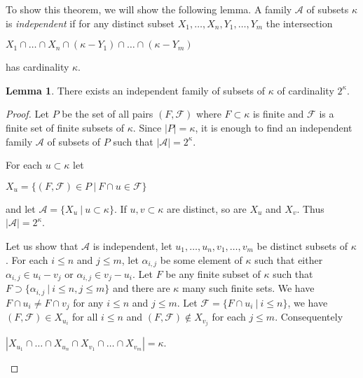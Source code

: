 \documentclass[8pt]{article}
\theoremstyle{definition}
\theoremstyle{definition}
\theoremstyle{definition}
\theoremstyle{definition}
\theoremstyle{definition}
\theoremstyle{definition}
\theoremstyle{definition}
\theoremstyle{definition}
\newtheorem{lemma}{Lemma}[section]
\theoremstyle{definition}
\theoremstyle{definition}
\theoremstyle{definition}
\theoremstyle{definition}
\theoremstyle{definition}
\theoremstyle{definition}
\theoremstyle{question}
\begin{document}
To show this theorem, we will show the following lemma. A family $\mathcal{A}$ 
of subsets $\kappa$ is \emph{independent} if for any distinct subset $X_1, \dots, X_n, Y_1, \dots, Y_m$ the intersection

\begin{center}
  $X_1 \cap \dots \cap X_n \cap (\kappa - Y_1) \cap \dots \cap (\kappa - Y_m)$
\end{center}
has cardinality $\kappa$.

\begin{lemma}
  There exists an independent family of subsets of $\kappa$ of cardinality $2^{\kappa}$.
\end{lemma}

\begin{proof}
  Let $P$ be the set of all pairs $(F, \mathcal{F})$ where $F \subset \kappa$ is finite and 
  $\mathcal{F}$ is a finite set of finite subsets of $\kappa$. Since $|P| = \kappa$, 
  it is enough to find an independent family $\mathcal{A}$ of subsets of $P$ such that $|\mathcal{A}| = 2^{\kappa}$.

  For each $u \subset \kappa$ let
  \begin{center}
    $X_u = \{ (F, \mathcal{F}) \in P \: | \: F \cap u \in \mathcal{F} \}$
  \end{center}
  and let $\mathcal{A} = \{ X_u \: | \: u \subset \kappa \}$. 
  If $u, v \subset \kappa$ are distinct, so are $X_u$ and $X_v$. Thus $|\mathcal{A}| = 2^{\kappa}$.

  Let us show that $\mathcal{A}$ is independent, let $u_1, \dots, u_n, v_1, \dots, v_m$
  be distinct subsets of $\kappa$. For each $i \leq n$ and $j \leq m$, 
  let $\alpha_{i, j}$ be some element of $\kappa$ such that either 
  $\alpha_{i,j} \in u_i - v_j$ or $\alpha_{i,j} \in v_j - u_i$. 
  Let $F$ be any finite subset of $\kappa$ such that $F \supset \{ \alpha_{i, j} \: | \: i \leq n, j \leq m \}$ and there
  are $\kappa$ many such finite sets.
  We have $F \cap u_i \neq F \cap v_j$ for any $i \leq n$ and $j \leq m$.
  Let $\mathcal{F} = \{ F \cap u_i \: | \: i \leq n \}$, we have $(F, \mathcal{F}) \in X_{u_i}$
  for all $i \leq n$ and $(F, \mathcal{F}) \notin X_{v_j}$ for each $j \leq m$. Consequentely
  \begin{center}
    $|X_{u_1} \cap \dots \cap X_{u_n} \cap X_{v_1} \cap \dots \cap X_{v_m}| = \kappa$.
  \end{center}
\end{proof}
\end{document}

